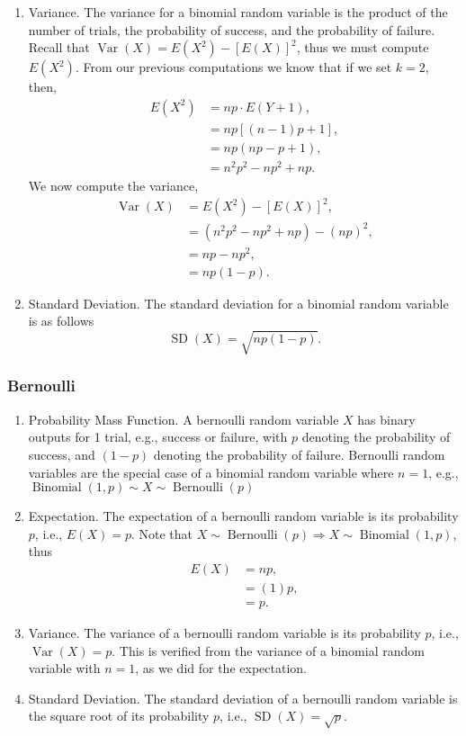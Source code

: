 \documentclass{amsproc}
\DeclareMathOperator{\bin}{\text{Binomial}}
\DeclareMathOperator{\bern}{\text{Bernoulli}}
\DeclareMathOperator{\Var}{\text{Var}}
\DeclareMathOperator{\SD}{\text{SD}}
\begin{document}
\begin{enumerate}
				\item Variance. The variance for a binomial random variable is the product of the number of trials, the probability of success, and the probability of failure. Recall that $\Var(X) = E(X^{2}) - \left[ E(X) \right]^{2}$, thus we must compute $E(X^{2})$. From our previous computations we know that if we set $k=2$, then,
					\begin{align*}
						E(X^{2}) &= np \cdot E\left( Y+1 \right), \\
						&= np\left[ (n-1)p + 1\right], \\
						&= np (np - p + 1), \\
						&= n^{2}p^{2} - np^{2} + np.
					\end{align*}
				We now compute the variance,
					\begin{align*}
						\Var(X) &= E(X^{2}) - \left[ E(X) \right]^{2}, \\
						&= \left( n^{2}p^{2} - np^{2} + np \right) - \left( np \right)^{2}, \\
						&= np - np^{2}, \\
						&= np(1 - p).
					\end{align*}

				\item Standard Deviation. The standard deviation for a binomial random variable is as follows \[\SD(X) = \sqrt{np(1-p)}.\]
			\end{enumerate}

			\subsubsection{Bernoulli}
			\begin{enumerate}
				\item Probability Mass Function. A bernoulli random variable $X$ has binary outputs for 1 trial, e.g., success or failure, with $p$ denoting the probability of success, and $(1-p)$ denoting the probability of failure. Bernoulli random variables are the special case of a binomial random variable where $n=1$, e.g., $\bin(1,p) \sim X \sim \bern(p)$
				
				\item Expectation. The expectation of a bernoulli random variable is its probability $p$, i.e., $E(X) = p$. Note that $X \sim \bern(p) \Rightarrow X \sim \bin(1,p)$, thus 
					\begin{align*}
						E(X) &= np, \\
						&= (1)p, \\
						&= p.
					\end{align*}
				
				\item Variance. The variance of a bernoulli random variable is its probability $p$, i.e., $\Var(X) = p$. This is verified from the variance of a binomial random variable with $n=1$, as we did for the expectation.

				\item Standard Deviation. The standard deviation of a bernoulli random variable is the square root of its probability $p$, i.e., $\SD(X) = \sqrt{p}$.
			\end{enumerate}
\end{document}
